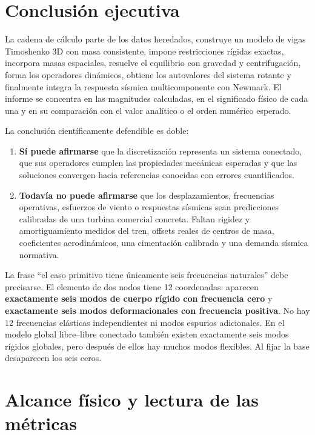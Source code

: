 \documentclass[oneside,a4paper,spanish,links]{amca}
\begin{document}
\clearpage
\section{Conclusión ejecutiva}

La cadena de cálculo parte de los datos heredados, construye un modelo de vigas Timoshenko 3D con masa consistente, impone restricciones rígidas exactas, incorpora masas espaciales, resuelve el equilibrio con gravedad y centrifugación, forma los operadores dinámicos, obtiene los autovalores del sistema rotante y finalmente integra la respuesta sísmica multicomponente con Newmark. El informe se concentra en las magnitudes calculadas, en el significado físico de cada una y en su comparación con el valor analítico o el orden numérico esperado.

La conclusión científicamente defendible es doble:

\begin{enumerate}
\item \textbf{Sí puede afirmarse} que la discretización representa un sistema conectado, que sus operadores cumplen las propiedades mecánicas esperadas y que las soluciones convergen hacia referencias conocidas con errores cuantificados.
\item \textbf{Todavía no puede afirmarse} que los desplazamientos, frecuencias operativas, esfuerzos de viento o respuestas sísmicas sean predicciones calibradas de una turbina comercial concreta. Faltan rigidez y amortiguamiento medidos del tren, offsets reales de centros de masa, coeficientes aerodinámicos, una cimentación calibrada y una demanda sísmica normativa.
\end{enumerate}

La frase ``el caso primitivo tiene únicamente seis frecuencias naturales'' debe precisarse. El elemento de dos nodos tiene 12 coordenadas: aparecen \textbf{exactamente seis modos de cuerpo rígido con frecuencia cero} y \textbf{exactamente seis modos deformacionales con frecuencia positiva}. No hay 12 frecuencias elásticas independientes ni modos espurios adicionales. En el modelo global libre--libre conectado también existen exactamente seis modos rígidos globales, pero después de ellos hay muchos modos flexibles. Al fijar la base desaparecen los seis ceros.

\section{Alcance físico y lectura de las métricas}
\end{document}

